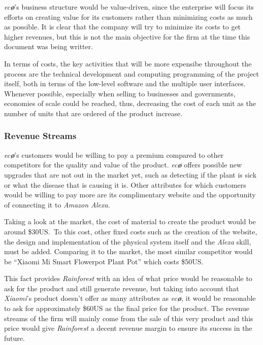 \documentclass[english,runningheads,a4paper]{llncs}[2018/03/10]
\begin{document}
        \textit{ec\textbf{\o}}'s business structure would be value-driven, since
        the enterprise will focus its efforts on creating value for its
        customers rather than minimizing costs as much as possible. It is clear
        that the company will try to minimize its costs to get higher revenues,
        but this is not the main objective for the firm at the time this
        document was being writter.

        In terms of costs, the key activities that will be more expensibe
        throughout the process are the technical development and computing
        programming of the project itself, both in terms of the low-level
        software and the multiple user interfaces. Whenever possible, especially
        when selling to businesses and governments, economies of scale could be
        reached, thus, decreasing the cost of each unit as the number of units
        that are ordered of the product increase.


        \subsubsection*{Revenue Streams}

        \textit{ec\textbf{\o}}'s customers would be willing to pay a premium
        compared to other competitors for the quality and value of the product.
        \textit{ec\textbf{\o}} offers possible new upgrades that are not out in
        the market yet, such as detecting if the plant is sick or what the
        disease that is causing it is. Other attributes for which customers
        would be willing to pay more are its complimentary website and the
        opportunity of connecting it to \textit{Amazon Alexa}.

        Taking a look at the market, the cost of material to create the product
        would be around \$30US.\ To this cost, other fixed costs such as the
        creation of the website, the design and implementation of the physical
        system itself and the \textit{Alexa} skill, must be added. Comparing it
        to the market, the most similar competitor would be ``Xiaomi Mi Smart
        Flowerpot Plant Pot'' which costs \$50US.\

        This fact provides \textit{Rainforest} with an idea of what price would
        be reasonable to ask for the product and still generate revenue, but
        taking into account that \textit{Xiaomi}'s product doesn't offer as many
        attributes as \textit{ec\textbf{\o}}, it would be reasonable to ask for
        approximately \$60US as the final price for the product. The revenue
        streams of the firm will mainly come from the sale of this very product
        and this price would give \textit{Rainforest} a decent revenue margin to
        ensure its success in the future.
\end{document}
